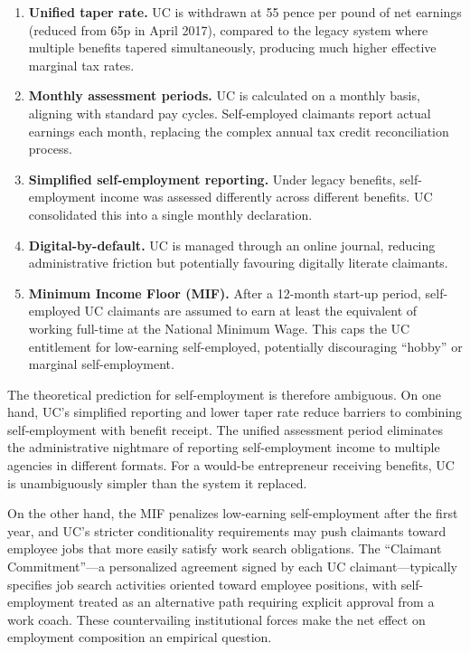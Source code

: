 \documentclass[12pt]{article}
\begin{document}
\begin{enumerate}
    \item \textbf{Unified taper rate.} UC is withdrawn at 55 pence per pound of net earnings (reduced from 65p in April 2017), compared to the legacy system where multiple benefits tapered simultaneously, producing much higher effective marginal tax rates.

    \item \textbf{Monthly assessment periods.} UC is calculated on a monthly basis, aligning with standard pay cycles. Self-employed claimants report actual earnings each month, replacing the complex annual tax credit reconciliation process.

    \item \textbf{Simplified self-employment reporting.} Under legacy benefits, self-employment income was assessed differently across different benefits. UC consolidated this into a single monthly declaration.

    \item \textbf{Digital-by-default.} UC is managed through an online journal, reducing administrative friction but potentially favouring digitally literate claimants.

    \item \textbf{Minimum Income Floor (MIF).} After a 12-month start-up period, self-employed UC claimants are assumed to earn at least the equivalent of working full-time at the National Minimum Wage. This caps the UC entitlement for low-earning self-employed, potentially discouraging ``hobby'' or marginal self-employment.
\end{enumerate}

The theoretical prediction for self-employment is therefore ambiguous. On one hand, UC's simplified reporting and lower taper rate reduce barriers to combining self-employment with benefit receipt. The unified assessment period eliminates the administrative nightmare of reporting self-employment income to multiple agencies in different formats. For a would-be entrepreneur receiving benefits, UC is unambiguously simpler than the system it replaced.

On the other hand, the MIF penalizes low-earning self-employment after the first year, and UC's stricter conditionality requirements may push claimants toward employee jobs that more easily satisfy work search obligations. The ``Claimant Commitment''---a personalized agreement signed by each UC claimant---typically specifies job search activities oriented toward employee positions, with self-employment treated as an alternative path requiring explicit approval from a work coach. These countervailing institutional forces make the net effect on employment composition an empirical question.
\end{document}
